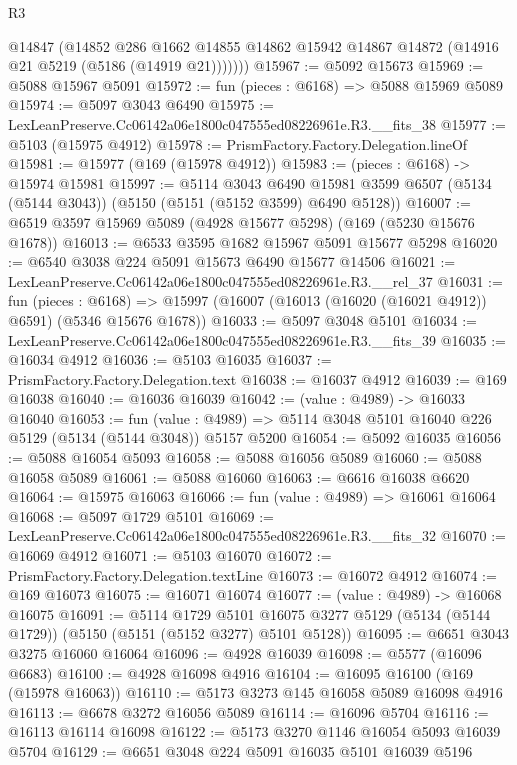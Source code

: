 \begin{lexlean}{R3}
\begin{coremodule}
          @14847
          (@14852
            @286
            @1662
            @14855
            @14862
            @15942
            @14867
            @14872
            (@14916 @21 @5219 (@5186 (@14919 @21)))))))
@15967 := @5092 @15673
@15969 := @5088 @15967 @5091
@15972 := fun (pieces : @6168) => @5088 @15969 @5089
@15974 := @5097 @3043 @6490
@15975 := LexLeanPreserve.Cc06142a06e1800c047555ed08226961e.R3.__fits_38
@15977 := @5103 (@15975 @4912)
@15978 := PrismFactory.Factory.Delegation.lineOf
@15981 := @15977 (@169 (@15978 @4912))
@15983 := (pieces : @6168) -> @15974 @15981
@15997 := @5114
    @3043
    @6490
    @15981
    @3599
    @6507
    (@5134 (@5144 @3043))
    (@5150 (@5151 (@5152 @3599) @6490 @5128))
@16007 := @6519 @3597 @15969 @5089 (@4928 @15677 @5298) (@169 (@5230 @15676 @1678))
@16013 := @6533 @3595 @1682 @15967 @5091 @15677 @5298
@16020 := @6540 @3038 @224 @5091 @15673 @6490 @15677 @14506
@16021 := LexLeanPreserve.Cc06142a06e1800c047555ed08226961e.R3.__rel_37
@16031 := fun (pieces : @6168) =>
  @15997 (@16007 (@16013 (@16020 (@16021 @4912)) @6591) (@5346 @15676 @1678))
@16033 := @5097 @3048 @5101
@16034 := LexLeanPreserve.Cc06142a06e1800c047555ed08226961e.R3.__fits_39
@16035 := @16034 @4912
@16036 := @5103 @16035
@16037 := PrismFactory.Factory.Delegation.text
@16038 := @16037 @4912
@16039 := @169 @16038
@16040 := @16036 @16039
@16042 := (value : @4989) -> @16033 @16040
@16053 := fun (value : @4989) =>
  @5114 @3048 @5101 @16040 @226 @5129 (@5134 (@5144 @3048)) @5157 @5200
@16054 := @5092 @16035
@16056 := @5088 @16054 @5093
@16058 := @5088 @16056 @5089
@16060 := @5088 @16058 @5089
@16061 := @5088 @16060
@16063 := @6616 @16038 @6620
@16064 := @15975 @16063
@16066 := fun (value : @4989) => @16061 @16064
@16068 := @5097 @1729 @5101
@16069 := LexLeanPreserve.Cc06142a06e1800c047555ed08226961e.R3.__fits_32
@16070 := @16069 @4912
@16071 := @5103 @16070
@16072 := PrismFactory.Factory.Delegation.textLine
@16073 := @16072 @4912
@16074 := @169 @16073
@16075 := @16071 @16074
@16077 := (value : @4989) -> @16068 @16075
@16091 := @5114
    @1729
    @5101
    @16075
    @3277
    @5129
    (@5134 (@5144 @1729))
    (@5150 (@5151 (@5152 @3277) @5101 @5128))
@16095 := @6651 @3043 @3275 @16060 @16064
@16096 := @4928 @16039
@16098 := @5577 (@16096 @6683)
@16100 := @4928 @16098 @4916
@16104 := @16095 @16100 (@169 (@15978 @16063))
@16110 := @5173 @3273 @145 @16058 @5089 @16098 @4916
@16113 := @6678 @3272 @16056 @5089
@16114 := @16096 @5704
@16116 := @16113 @16114 @16098
@16122 := @5173 @3270 @1146 @16054 @5093 @16039 @5704
@16129 := @6651 @3048 @224 @5091 @16035 @5101 @16039 @5196

\end{coremodule}
\end{lexlean}
